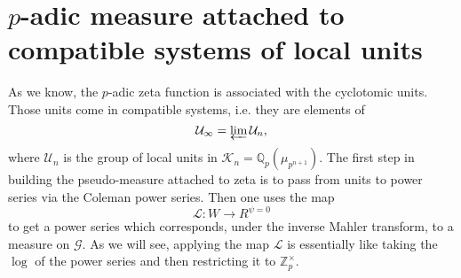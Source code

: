 \documentclass[twoside,10pt]{article}
\newcommand{\rarr}{\rightarrow}
\newcommand{\Z}{\mathbb{Z}}
\newcommand{\Q}{\mathbb{Q}}
\newcommand{\C}{\mathbb{C}}
\newcommand{\Gfrak}{\mathfrak{G}}
\newcommand{\curlG}{\mathcal{G}}
\newcommand{\curlM}{\mathcal{M}}
\newcommand{\curlU}{\mathcal{U}}
\newcommand{\curlK}{\mathcal{K}}
\newcommand{\curlL}{\mathcal{L}}
\newcommand{\Dist}{\mathfrak{D}}
\newcommand{\Meas}{\mathfrak{M}}
\newcommand{\Hom}{\text{Hom}}
\newcommand{\Step}{\text{Step}}
\begin{document}
%
%
%
%	
%
%
%

\section{$p$-adic measure attached to compatible systems of local units}
As we know, the $p$-adic zeta function is associated with the cyclotomic units. Those units come in compatible systems, i.e. they are elements of
\[\curlU_\infty=\varprojlim \curlU_n,\]
where $\curlU_n$ is the group of local units in $\curlK_n=\Q_p(\mu_{p^{n+1}})$. The first step in building the pseudo-measure attached to zeta is to pass from units to power series via the Coleman power series. Then one uses the map
\[\curlL:W\rarr R^{\psi=0}\]
to get a power series which corresponds, under the inverse Mahler transform, to a measure on $\curlG$. As we will see, applying the map $\curlL$ is essentially like taking the $\log$ of the power series and then restricting it to $\Z_p^\times$.
\end{document}
